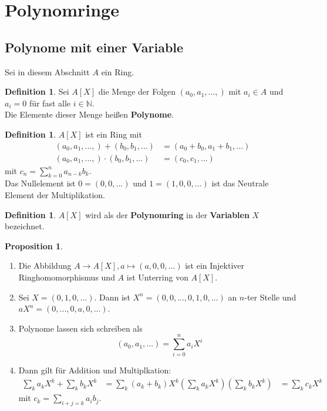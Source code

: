 \documentclass[10pt,a4paper]{article}
\newcommand{\N}{\ensuremath{\mathbb{N}}}
\theoremstyle{plain}
\theoremstyle{definition}
\newtheorem{definition}[theorem]{Definition}
\newtheorem{prop}[theorem]{Proposition}
\theoremstyle{remark}
\begin{document}
\section{Polynomringe}
\subsection{Polynome mit einer Variable}
Sei in diesem Abschnitt $A$ ein Ring.

	\begin{definition}
		Sei $A[X]$ die Menge der Folgen $(a_0,a_1,...,)$ mit $a_i\in A$ und $a_i=0$ für fast alle $i\in\N$.\\
		Die Elemente dieser Menge heißen \textbf{Polynome}.
	\end{definition}
	
	\begin{definition}
		$A[X]$ ist ein Ring mit 
		\begin{align*}
		(a_0,a_1,...,)+(b_0,b_1,...)&=(a_0+b_0,a_1+b_1,...)\\
		(a_0,a_1,...,)\cdot(b_0,b_1,...)&=(c_0,c_1,...)
		\end{align*}
		mit $c_n=\sum_{k=0}^n a_{n-k}b_k$.\\
		Das Nullelement ist $0=(0,0,...)$ und $1=(1,0,0,...)$ ist das Neutrale Element der Multiplikation.\\
	\end{definition}

	\begin{definition}
		$A[X]$ wird als der \textbf{Polynomring} in der \textbf{Variablen} $X$ bezeichnet.\\
	\end{definition}

	\begin{prop}
		\begin{enumerate}
			\item Die Abbildung $A\to A[X],a\mapsto(a,0,0,...)$ ist ein Injektiver Ringhomomorphismus und $A$ ist Unterring von $A[X]$.
			\item Sei $X=(0,1,0,...)$. Dann ist $X^n=(0,0,...,0,1,0,...)$ an $n$-ter Stelle und $aX^n=(0,...,0,a,0,...)$. 
			\item Polynome lassen sich schreiben als
			\[(a_0,a_1,...)=\sum_{i=0}^na_iX^i\]
			\item Dann gilt für Addition und Multiplkation:
			\begin{align*}
			\sum_{k}a_kX^k+\sum_kb_kX^k&=\sum_k(a_k+b_k)X^k
			\left(\sum_{k}a_kX^k\right)\left(\sum_kb_kX^k\right)&=\sum_k c_kX^k
			\end{align*}
			mit $c_k=\sum_{i+j=k}a_ib_j$.
		\end{enumerate}
	\end{prop}
\end{document}
